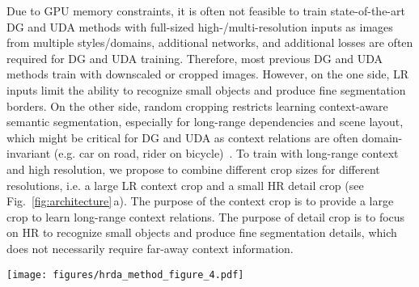 \documentclass[journal,compsoc]{IEEEtran}
\begin{document}
Due to GPU memory constraints, it is often not feasible to train state-of-the-art DG and UDA methods with full-sized high-/multi-resolution inputs as images from multiple styles/domains, additional networks, and additional losses are often required for DG and UDA training. Therefore, most previous DG and UDA methods train with downscaled or cropped images. 
However, on the one side, LR inputs limit the ability to recognize small objects and produce fine segmentation borders. On the other side, random cropping restricts learning context-aware semantic segmentation, especially for long-range dependencies and scene layout, which might be critical for DG and UDA as context relations are often domain-invariant (e.g. car on road, rider on bicycle)~\cite{huang2020contextual, yang2021context}.
To train with long-range context and high resolution, we propose to combine different crop sizes for different resolutions, i.e. a large LR context crop and a small HR detail crop (see Fig.~\ref{fig:architecture}\,a). The purpose of the context crop is to provide a large crop to learn long-range context relations. The purpose of detail crop is to focus on HR to recognize small objects and produce fine segmentation details, which does not necessarily require far-away context information.

\begin{figure*}
\centering

\begin{minipage}[t]{0.78\linewidth}
\vspace{0pt}
\texttt{[image: figures/hrda\_method\_figure\_4.pdf]}
\end{minipage}\hfill
\begin{minipage}[t]{0.2\linewidth}
\vspace{0pt}
\caption{(a) Multi-resolution training with low-resolution (LR) context and high-resolution (HR) detail crop. The prediction of the detail crop is fused into the context prediction within the region where it was cropped from by a learned scale attention. (b) For pseudo-label generation in UDA, multiple detail crops are generated using overlapping slide inference to cover the entire context crop. The pseudo-label is fused from HR pred. $\hat{y}_\mathit{c,HR}^T$ and LR pred. $\hat{y}_\mathit{c}^T$ with the full attention $a_c^T$ similar to (a) (see Sec.~\ref{sec:overlapping_slide_inference}). 
}
\label{fig:architecture}
\end{minipage}

\end{figure*}
\end{document}
